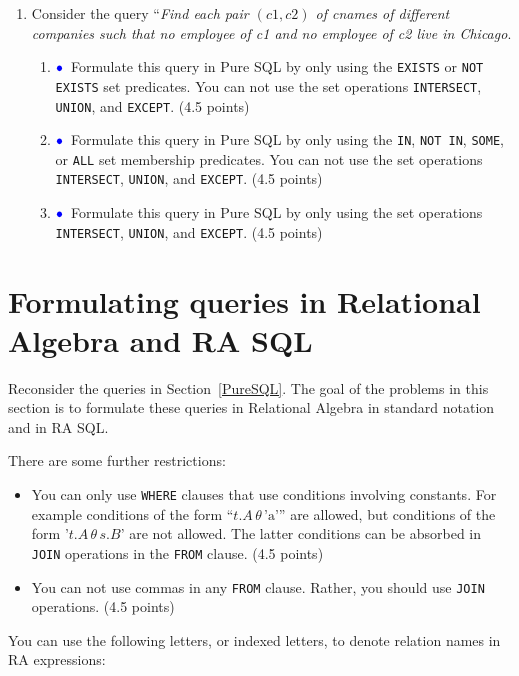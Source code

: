 \documentclass[11pt]{article}
\newcommand{\blue}[1]{{\color{blue}#1}}
\newcommand{\bluebullet}{$\blue{\bullet}$}
\begin{document}
\begin{enumerate}[resume]
\item \label{queryFour} 
Consider the query ``\emph{Find each pair $(c1,c2)$ of cnames of different companies such that
no employee of c1 and no employee of c2 live in Chicago}.
\begin{enumerate}
\item  \bluebullet\   Formulate this query in Pure SQL by only using the {\tt EXISTS} or {\tt NOT EXISTS} set predicates.
You can not use the set operations {\tt INTERSECT}, {\tt UNION}, and {\tt EXCEPT}. (4.5 points)

\item  \bluebullet\ Formulate this query in Pure SQL by only using the {\tt  IN}, {\tt NOT IN}, {\tt SOME}, or {\tt ALL} set membership predicates.
You can not use the set operations {\tt INTERSECT}, {\tt UNION}, and {\tt EXCEPT}. (4.5 points)

\item  \bluebullet\   Formulate this query in Pure SQL by only using the set operations {\tt INTERSECT}, {\tt UNION}, and {\tt EXCEPT}. (4.5 points)

\end{enumerate}
\end{enumerate}

\newpage

\section{Formulating queries in Relational Algebra and RA SQL}

Reconsider the queries in Section~\ref{PureSQL}.   The goal of the problems in this section
is to formulate these queries in Relational Algebra in standard notation and in RA SQL.  

There are some further restrictions:
\begin{itemize}
\item You can only use {\tt WHERE} clauses that use 
conditions involving constants.   For example conditions of the form ``$t.A\, \theta\, \text{'a'}$'' are allowed, but conditions of the 
form '$t.A\, \theta\, s.B$' are not allowed.   The latter conditions can be absorbed in {\tt JOIN} operations in the {\tt FROM} clause. (4.5 points)
\item You can not use commas in any {\tt FROM} clause.  Rather, you should use {\tt JOIN} operations. (4.5 points)
\end{itemize}

You can use the following letters, or indexed letters, to denote relation names in RA expressions:
\end{document}
